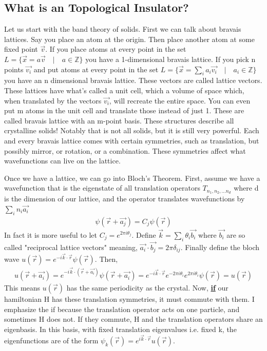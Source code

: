 \subsection{What is an Topological Insulator?}
 Let us start with the band theory of solids. First we can talk about bravais lattices. Say you place an atom at the origin. Then place another atom at some fixed point $\vec{v}$. If you place atoms at every point in the set $L= \{\vec{x} = a\vec{v} \quad | \quad a \in \mathbb{Z} \}$ you have a 1-dimensional bravais lattice. If you pick n points $\vec{v_i}$ and put atoms at every point in the set $L= \{\vec{x} = \sum_i a_i\vec{v_i} \quad | \quad a_i \in \mathbb{Z} \}$ you have an n dimensional bravais lattice. These vectors are called lattice vectors. These lattices have what's called a unit cell, which a volume of space which, when translated by the vectors $\vec{v_i}$, will recreate the entire space. You can even put m atoms in the unit cell and translate those instead of just 1. These are called bravais lattice with an m-point basis. These structures describe all crystalline solids! Notably that is not all solids, but it is still very powerful. Each and every bravais lattice comes with certain symmetries, such as translation, but possibly mirror, or rotation, or a combination. These symmetries affect what wavefunctions can live on the lattice.

Once we have a lattice, we can go into Bloch's Theorem. First, assume we have a wavefunction that is the eigenstate of all translation operators $T_{n_1,n_2,...n_d}$ where d is the dimension of our lattice, and the operator translates wavefunctions by $\sum_i n_i \vec{a_i}$
\begin{align}
\psi(\vec{r}+\vec{a_j})=C_j\psi(\vec{r})
\end{align}
In fact it is more useful to let $C_j=e^{2 \pi i \theta_j}$. Define $\vec{k} = \sum_i \theta_i\vec{b_i}$ where $\vec{b_i}$ are so called "reciprocal lattice vectors" meaning, $\vec{a_i}\cdot \vec{b_j}=2 \pi \delta_{ij}$. Finally define the bloch wave $u(\vec{r})=e^{-i \vec{k}\cdot \vec{r}}\psi(\vec{r})$. Then,
\begin{align}
u(\vec{r}+\vec{a_i})=e^{-i \vec{k}\cdot (\vec{r}+\vec{a_i})}\psi(\vec{r}+\vec{a_i})=e^{-i \vec{k}\cdot \vec{r}}e^{-2 \pi i \theta_i }e^{2 \pi i \theta_i}\psi(\vec{r})=u(\vec{r})
\end{align}
This means $u(\vec{r})$ has the same periodicity as the crystal. Now, \underline{\textbf{if}} our hamiltonian H has these translation symmetries, it must commute with them. I emphasize the if because the translation operator acts on one particle, and sometimes H does not. If they commute, H and the translation operators share an eigenbasis. In this basis, with fixed translation eigenvalues i.e. fixed k, the eigenfunctions are of the form $\psi_k(\vec{r})=e^{i \vec{k} \cdot \vec{r}} u(\vec{r})$. 

